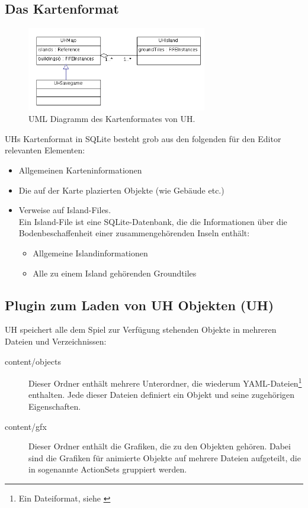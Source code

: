 \subsection{Das Kartenformat}
\label{kartenformat}

%
%
\begin{figure}[htbp]
  \centering

    \includegraphics[width=0.7\textwidth]{gfx/klassendiagramm-UHSaveGame.png}

  \caption{UML Diagramm des Kartenformates von UH.}
  \label{figure:automaton-intersection}
\end{figure}

UHs Kartenformat in SQLite besteht grob aus den folgenden für den
Editor relevanten Elementen:
\begin{itemize}
  \item Allgemeinen Karteninformationen
  \item Die auf der Karte plazierten Objekte (wie Gebäude etc.)
  \item Verweise auf Island-Files. \\
  Ein Island-File ist eine SQLite-Datenbank,
  die die Informationen über die Bodenbeschaffenheit einer zusammengehörenden
  Inseln enthält:
  \begin{itemize}
    \item Allgemeine Islandinformationen
    \item Alle zu einem Island gehörenden Groundtiles
  \end{itemize}
\end{itemize}


\subsection{Plugin zum Laden von UH Objekten (UH)}
UH speichert alle dem Spiel zur Verfügung stehenden Objekte in mehreren Dateien
und Verzeichnissen:

\begin{description}
\item[content/objects] Dieser Ordner enthält mehrere Unterordner, die wiederum
YAML-Dateien\footnote{Ein Dateiformat, siehe \cite{yaml}} enthalten. Jede
dieser Dateien definiert ein Objekt und seine zugehörigen Eigenschaften.
\item[content/gfx] Dieser Ordner enthält die Grafiken, die zu den Objekten
gehören. Dabei sind die Grafiken für animierte Objekte auf mehrere Dateien
aufgeteilt, die in sogenannte ActionSets gruppiert werden.
\end{description}

